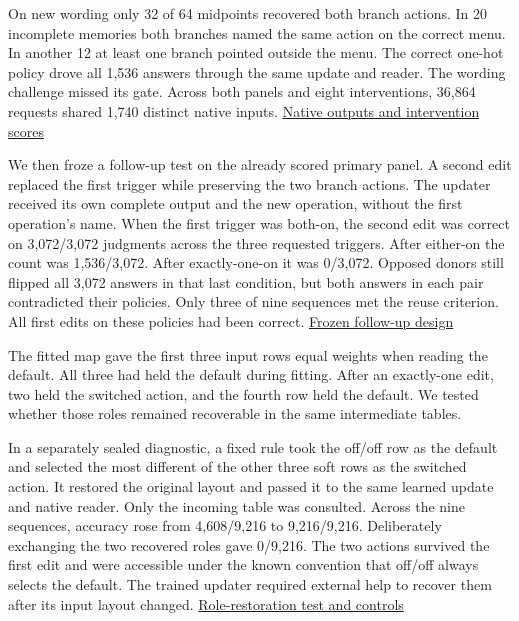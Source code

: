 \documentclass[11pt]{article}
\begin{document}
On new wording only 32 of 64 midpoints recovered both branch actions. In 20 incomplete memories both branches named the same action on the correct menu. In another 12 at least one branch pointed outside the menu. The correct one-hot policy drove all 1,536 answers through the same update and reader. The wording challenge missed its gate. Across both panels and eight interventions, 36,864 requests shared 1,740 distinct native inputs. \href{https://github.com/RyoSpiralArchitect/self-fold/blob/v1.0.0/provenance/state_only_20261104/RESULTS.md}{Native outputs and intervention scores}

We then froze a follow-up test on the already scored primary panel. A second edit replaced the first trigger while preserving the two branch actions. The updater received its own complete output and the new operation, without the first operation's name. When the first trigger was both-on, the second edit was correct on 3,072/3,072 judgments across the three requested triggers. After either-on the count was 1,536/3,072. After exactly-one-on it was 0/3,072. Opposed donors still flipped all 3,072 answers in that last condition, but both answers in each pair contradicted their policies. Only three of nine sequences met the reuse criterion. All first edits on these policies had been correct. \href{https://github.com/RyoSpiralArchitect/self-fold/blob/v1.0.0/provenance/state_only_20261104/COMPOSITION_PLAN.md}{Frozen follow-up design}

The fitted map gave the first three input rows equal weights when reading the default. All three had held the default during fitting. After an exactly-one edit, two held the switched action, and the fourth row held the default. We tested whether those roles remained recoverable in the same intermediate tables.

In a separately sealed diagnostic, a fixed rule took the off/off row as the default and selected the most different of the other three soft rows as the switched action. It restored the original layout and passed it to the same learned update and native reader. Only the incoming table was consulted. Across the nine sequences, accuracy rose from 4,608/9,216 to 9,216/9,216. Deliberately exchanging the two recovered roles gave 0/9,216. The two actions survived the first edit and were accessible under the known convention that off/off always selects the default. The trained updater required external help to recover them after its input layout changed. \href{https://github.com/RyoSpiralArchitect/self-fold/blob/v1.0.0/provenance/state_only_20261104/RESULTS.md#can-the-two-actions-be-recovered-from-the-same-table}{Role-restoration test and controls}
\end{document}
